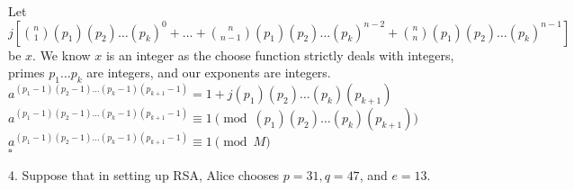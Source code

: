 \documentclass{letter}
\begin{document}
\begin{itemize}
	Let $j\left[ { n \choose 1} (p_1)(p_2) \dots (p_k)^0 + \dots + {n \choose n-1}(p_1)(p_2) \dots (p_k)^{n-2} + {n \choose n}(p_1)(p_2) \dots (p_k)^{n-1}\right]$ be $x$. We know $x$ is an integer as the choose function strictly deals with integers, primes $p_1 \dots p_k$ are integers, and our exponents are integers.\\
	
	$a^{(p_1 - 1)(p_2 - 1)\dots (p_k - 1)(p_{k+1} - 1)} = 1 + j(p_1)(p_2)\dots (p_k)(p_{k+1})$\\
	
	$a^{(p_1 - 1)(p_2 - 1)\dots (p_k - 1)(p_{k+1} - 1)} \equiv 1 \pmod{(p_1)(p_2)\dots (p_k)(p_{k+1})}$\\
	
	$a^{(p_1 - 1)(p_2 - 1)\dots (p_k - 1)(p_{k+1} - 1)} \equiv 1 \pmod{M}$\\
	
	$\square$
\end{itemize}

\clearpage

4. Suppose that in setting up RSA, Alice chooses $p = 31, q=47$, and $e=13$.
\end{document}
